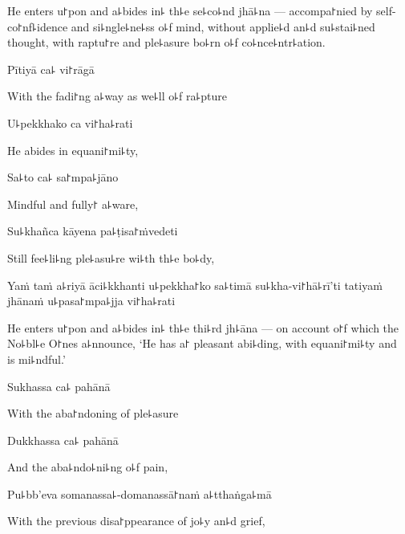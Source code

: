 \begin{english}
  He enters u꜓pon and a꜕bides in꜕ th꜕e se꜕co꜕nd jhā꜕na --- accompa꜓nied
  by self-co꜓nf꜕idence and si꜕ngle꜕ne꜕ss o꜕f mind, without applie꜕d an꜕d
  su꜕stai꜕ned thought, with raptu꜓re and ple꜕asure bo꜕rn o꜕f
  co꜕nce꜕ntr꜕ation.
\end{english}

\clearpage

Pītiyā ca꜕ vi꜓rāgā

\begin{english}
  With the fadi꜓ng a꜕way as we꜕ll o꜕f ra꜕pture
\end{english}

U꜕pekkhako ca vi꜓ha꜕rati

\begin{english}
  He abides in equani꜓mi꜕ty,
\end{english}

Sa꜕to ca꜕ sa꜓mpa꜕jāno

\begin{english}
  Mindful and fully꜓ a꜕ware,
\end{english}

Su꜕khañca kāyena pa꜕ṭisa꜓ṁvedeti

\begin{english}
  Still fee꜕li꜕ng ple꜕asu꜕re wi꜕th th꜕e bo꜕dy,
\end{english}

Yaṁ taṁ a꜕riyā āci꜕kkhanti u꜕pekkha꜓ko sa꜕timā su꜕kha-vi꜓hā꜕rī'ti tatiyaṁ jhānaṁ u꜕pasa꜓mpa꜕jja vi꜓ha꜕rati

\begin{english}
  He enters u꜓pon and a꜕bides in꜕ th꜕e thi꜕rd jh꜕āna --- on account o꜓f
  which the No꜕bl꜕e O꜓nes a꜕nnounce, `He has a꜓ pleasant abi꜕ding, with
  equani꜓mi꜕ty and\\ is mi꜕ndful.'
\end{english}

Sukhassa ca꜕ pahānā

\begin{english}
  With the aba꜓ndoning of ple꜕asure
\end{english}

Dukkhassa ca꜕ pahānā

\begin{english}
  And the aba꜕ndo꜕ni꜕ng o꜕f pain,
\end{english}

Pu꜕bb'eva somanassa꜕-domanassā꜓naṁ a꜕tthaṅga꜕mā

\begin{english}
  With the previous disa꜓ppearance of jo꜕y an꜕d grief,
\end{english}

